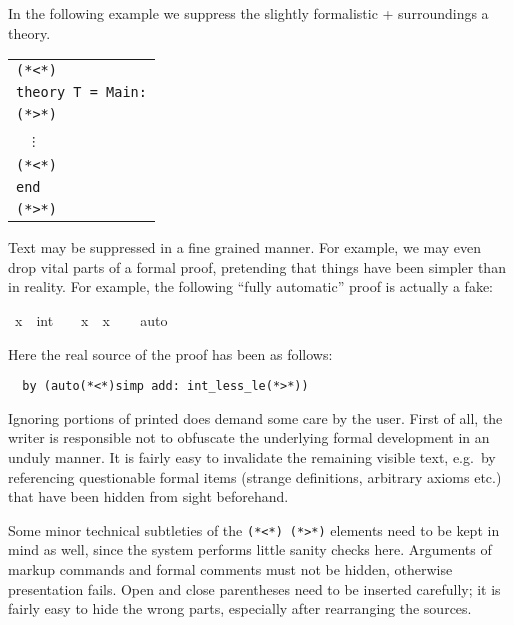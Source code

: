 \begin{isabellebody}
\begin{isamarkuptext}
  In the following example we suppress the slightly formalistic
   +  surroundings a theory.

  \medskip

  \begin{tabular}{l}
  \verb,(,\verb,*,\verb,<,\verb,*,\verb,), \\
  \texttt{theory T = Main:} \\
  \verb,(,\verb,*,\verb,>,\verb,*,\verb,), \\
  ~~$\vdots$ \\
  \verb,(,\verb,*,\verb,<,\verb,*,\verb,), \\
  \texttt{end} \\
  \verb,(,\verb,*,\verb,>,\verb,*,\verb,), \\
  \end{tabular}

  \medskip

  Text may be suppressed in a fine grained manner.  For example, we
  may even drop vital parts of a formal proof, pretending that things
  have been simpler than in reality.  For example, the following
  ``fully automatic'' proof is actually a fake:%
\end{isamarkuptext}%
\isamarkuptrue%
\ {\isachardoublequote}x\ {\isasymnoteq}\ {\isacharparenleft}{}{\isacharcolon}{\isacharcolon}int{\isacharparenright}\ {\isasymLongrightarrow}\ {}\ {\isacharless}\ x\ {\isacharasterisk}\ x{\isachardoublequote}\isanewline
\ \ \isamarkupfalse%
\ {\isacharparenleft}auto{\isacharparenright}\isamarkupfalse%
%
\begin{isamarkuptext}%
\noindent Here the real source of the proof has been as follows:

\begin{verbatim}
  by (auto(*<*)simp add: int_less_le(*>*))
\end{verbatim}

  \medskip Ignoring portions of printed does demand some care by the
  user.  First of all, the writer is responsible not to obfuscate the
  underlying formal development in an unduly manner.  It is fairly
  easy to invalidate the remaining visible text, e.g.\ by referencing
  questionable formal items (strange definitions, arbitrary axioms
  etc.) that have been hidden from sight beforehand.

  Some minor technical subtleties of the
  \verb,(,\verb,*,\verb,<,\verb,*,\verb,),~\verb,(,\verb,*,\verb,>,\verb,*,\verb,),
  elements need to be kept in mind as well, since the system performs
  little sanity checks here.  Arguments of markup commands and formal
  comments must not be hidden, otherwise presentation fails.  Open and
  close parentheses need to be inserted carefully; it is fairly easy
  to hide the wrong parts, especially after rearranging the sources.


\end{isamarkuptext}
\end{isabellebody}
